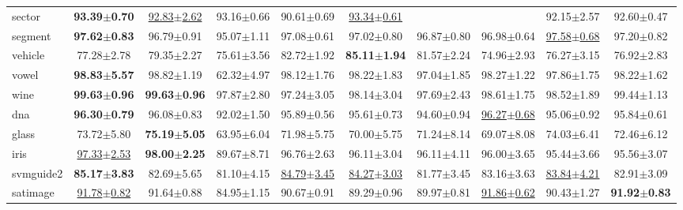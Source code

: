 \documentclass{article}
\begin{document}
\begin{table*}[t]
\begin{tabular*}{\linewidth}{@{\extracolsep{-0.25cm}}lccccccccc}
sector             & \textbf{93.39$\pm$0.70}   &\underline{92.83$\pm$2.62}&93.16$\pm$0.66      &90.61$\pm$0.69            &\underline{93.34$\pm$0.61}                    &\                         &\                   &92.15$\pm$2.57            &92.60$\pm$0.47\\
segment            & \textbf{97.62$\pm$0.83}   &96.79$\pm$0.91            &95.07$\pm$1.11      &97.08$\pm$0.61            &97.02$\pm$0.80       &96.87$\pm$0.80    &96.98$\pm$0.64             &\underline{97.58$\pm$0.68}&97.20$\pm$0.82\\
vehicle            & 77.28$\pm$2.78            &79.35$\pm$2.27            &75.61$\pm$3.56      &82.72$\pm$1.92            &\textbf{85.11$\pm$1.94}       &81.57$\pm$2.24    &74.96$\pm$2.93             &76.27$\pm$3.15            &76.92$\pm$2.83\\
vowel              &\textbf{98.83$\pm$5.57}    &98.82$\pm$1.19            &62.32$\pm$4.97      &98.12$\pm$1.76            &98.22$\pm$1.83       &97.04$\pm$1.85    &98.27$\pm$1.22             &97.86$\pm$1.75            &98.22$\pm$1.62\\
wine               &\textbf{99.63$\pm$0.96}    &\textbf{99.63$\pm$0.96}   &97.87$\pm$2.80      &97.24$\pm$3.05            &98.14$\pm$3.04       &97.69$\pm$2.43    &98.61$\pm$1.75             &98.52$\pm$1.89            &99.44$\pm$1.13            \\
dna                &\textbf{96.30$\pm$0.79}    &96.08$\pm$0.83            &92.02$\pm$1.50      &95.89$\pm$0.56            &95.61$\pm$0.73       &94.60$\pm$0.94    &\underline{96.27$\pm$0.68}             &95.06$\pm$0.92            &95.84$\pm$0.61\\
glass              & 73.72$\pm$5.80            &\textbf{75.19$\pm$5.05}   &63.95$\pm$6.04      &71.98$\pm$5.75            &70.00$\pm$5.75       &71.24$\pm$8.14    &69.07$\pm$8.08             &74.03$\pm$6.41            &72.46$\pm$6.12\\
iris               &\underline{97.33$\pm$2.53} &\textbf{98.00$\pm$2.25}   &89.67$\pm$8.71      &96.76$\pm$2.63            &96.11$\pm$3.04       &96.11$\pm$4.11    &96.00$\pm$3.65             &95.44$\pm$3.66            &95.56$\pm$3.07\\
svmguide2          &\textbf{85.17$\pm$3.83}    &82.69$\pm$5.65            &81.10$\pm$4.15      &\underline{84.79$\pm$3.45}&\underline{84.27$\pm$3.03}  &81.77$\pm$3.45    &83.16$\pm$3.63             &\underline{83.84$\pm$4.21}            &82.91$\pm$3.09\\
satimage           &\underline{91.78$\pm$0.82} &91.64$\pm$0.88            &84.95$\pm$1.15      &90.67$\pm$0.91            &89.29$\pm$0.96       &89.97$\pm$0.81    &\underline{91.86$\pm$0.62} &90.43$\pm$1.27            &\textbf{91.92$\pm$0.83}\\
\bottomrule
\end{tabular*}
\vspace{-0.3cm}
\end{table*}
\end{document}
